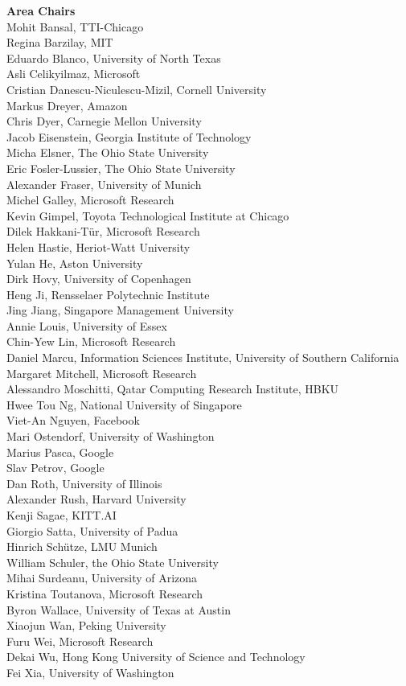 {\bf Area Chairs}\\
Mohit Bansal, TTI-Chicago\\
Regina Barzilay, MIT\\
Eduardo Blanco, University of North Texas\\
Asli Celikyilmaz, Microsoft\\
Cristian Danescu-Niculescu-Mizil, Cornell University\\
Markus Dreyer, Amazon\\
Chris Dyer, Carnegie Mellon University\\
Jacob Eisenstein, Georgia Institute of Technology\\
Micha Elsner, The Ohio State University\\
Eric Fosler-Lussier, The Ohio State University\\
Alexander Fraser, University of Munich\\
Michel Galley, Microsoft Research\\
Kevin Gimpel, Toyota Technological Institute at Chicago\\
Dilek Hakkani-Tür, Microsoft Research\\
Helen Hastie, Heriot-Watt University\\
Yulan He, Aston University\\
Dirk Hovy, University of Copenhagen\\
Heng Ji, Rensselaer Polytechnic Institute\\
Jing Jiang, Singapore Management University\\
Annie Louis, University of Essex\\
Chin-Yew Lin, Microsoft Research\\
Daniel Marcu, Information Sciences Institute, University of Southern California\\
Margaret Mitchell, Microsoft Research\\
Alessandro Moschitti, Qatar Computing Research Institute, HBKU\\
Hwee Tou Ng, National University of Singapore\\
Viet-An Nguyen, Facebook\\
Mari Ostendorf, University of Washington\\
Marius Pasca, Google\\
Slav Petrov, Google\\
Dan Roth, University of Illinois\\
Alexander Rush, Harvard University\\
Kenji Sagae, KITT.AI\\
Giorgio Satta, University of Padua\\
Hinrich Schütze, LMU Munich\\
William Schuler, the Ohio State University\\
Mihai Surdeanu, University of Arizona\\
Kristina Toutanova, Microsoft Research\\
Byron Wallace, University of Texas at Austin\\
Xiaojun Wan, Peking University\\
Furu Wei, Microsoft Research\\
Dekai Wu, Hong Kong University of Science and Technology\\
Fei Xia, University of Washington
